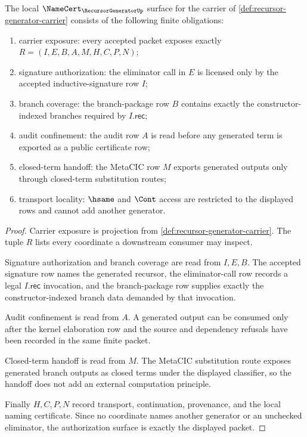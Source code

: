 \begin{theorem}
\label{thm:recursor-generator-authorization-obligations}
The local $\NameCert_{\RecursorGeneratorUp}$ surface for the carrier of \autoref{def:recursor-generator-carrier} consists of the following finite obligations:
\begin{enumerate}
\item carrier exposure: every accepted packet exposes exactly $R=(I,E,B,A,M,H,C,P,N)$;
\item signature authorization: the eliminator call in $E$ is licensed only by the accepted inductive-signature row $I$;
\item branch coverage: the branch-package row $B$ contains exactly the constructor-indexed branches required by $I.\mathsf{rec}$;
\item audit confinement: the audit row $A$ is read before any generated term is exported as a public certificate row;
\item closed-term handoff: the MetaCIC row $M$ exports generated outputs only through closed-term substitution routes;
\item transport locality: $\hsame$ and $\Cont$ access are restricted to the displayed rows and cannot add another generator.
\end{enumerate}
\end{theorem}
\begin{proof}
Carrier exposure is projection from \autoref{def:recursor-generator-carrier}. The tuple $R$ lists every coordinate a downstream consumer may inspect.

Signature authorization and branch coverage are read from $I,E,B$. The accepted signature row names the generated recursor, the eliminator-call row records a legal $I.\mathsf{rec}$ invocation, and the branch-package row supplies exactly the constructor-indexed branch data demanded by that invocation.

Audit confinement is read from $A$. A generated output can be consumed only after the kernel elaboration row and the source and dependency refusals have been recorded in the same finite packet.

Closed-term handoff is read from $M$. The MetaCIC substitution route exposes generated branch outputs as closed terms under the displayed classifier, so the handoff does not add an external computation principle.

Finally $H,C,P,N$ record transport, continuation, provenance, and the local naming certificate. Since no coordinate names another generator or an unchecked eliminator, the authorization surface is exactly the displayed packet.
\end{proof}

